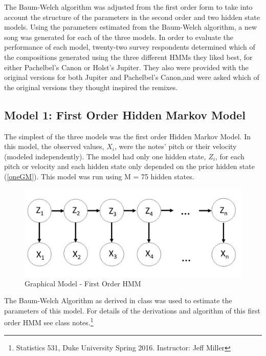 \documentclass{article} %
\begin{document}
The Baum-Welch algorithm was adjusted from the  first order form to take into account the structure of the parameters in the second order and two hidden state models.   Using the parameters estimated from the Baum-Welch algorithm, a new song was generated for each of the three models. In order to evaluate the performance of each model, twenty-two survey respondents determined which of the compositions generated using the three different HMMs they liked best, for either Pachelbel's Canon or Holst's Jupiter. They also were provided with the original versions for both Jupiter and Pachelbel's Canon,and were asked which of the original versions they thought inspired the remixes. 

\subsection {Model 1: First Order Hidden Markov Model}

The simplest of the three models was the first order Hidden Markov Model. In this model, the observed values, $X_i$, were the notes' pitch or their velocity (modeled independently). The model had only one hidden state, $Z_i$, for each pitch or velocity  and each hidden state only depended on the prior hidden state (\autoref{oneGM}). This model was run using M = 75 hidden states.

\begin{figure}[H]
\begin{center}


\includegraphics [scale = 0.35] {Model1.jpg}

\caption{Graphical Model - First Order HMM \label{oneGM}}
\end{center}
\end{figure}

The Baum-Welch Algorithm as derived in class was used to estimate the parameters of this model. For details of the derivations and algorithm of this first order HMM see class notes.\footnote{Statistics 531, Duke University Spring 2016. Instructor: Jeff Miller}
 
\end{document}
